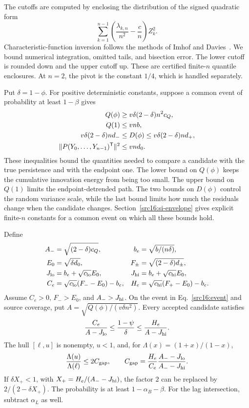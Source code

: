 The cutoffs are computed by enclosing the distribution of the signed quadratic form
\[
 \sum_{k=1}^{n-1}\left(\frac{\lambda_{k,n}}{n^2}
              -\frac{c}{n}\right)Z_k^2.
\]
Characteristic-function inversion follows the methods of Imhof and Davies~\cite{imhof1961,davies1980}. We bound numerical integration, omitted tails, and bisection error. The lower cutoff is rounded down and the upper cutoff up. These are certified finite-$n$ quantile enclosures. At $n=2$, the pivot is the constant $1/4$, which is handled separately.


Put $\delta=1-\phi$. For positive deterministic constants, suppose a common event of probability at least $1-\beta$ gives
\begin{align}\label{src16:event}
 Q(\phi)&\ge v\delta(2-\delta)n^2c_Q,\notag\\
 Q(1)&\le vnb,\notag\\
 v\delta(2-\delta)nd_-&\le D(\phi)\le v\delta(2-\delta)nd_+,\notag\\
 \|P(Y_0,\ldots,Y_{n-1})^{\mathsf T}\|^2&\le vnd_0.
\end{align}
These inequalities bound the quantities needed to compare a candidate with the true persistence and with the endpoint one. The lower bound on $Q(\phi)$ keeps the cumulative innovation energy from being too small. The upper bound on $Q(1)$ limits the endpoint-detrended path. The two bounds on $D(\phi)$ control the random variance scale, while the last bound limits how much the residuals change when the candidate changes. Section~\ref{src16:si-envelope} gives explicit finite-$n$ constants for a common event on which all these bounds hold.

\begin{theorem*}\label{src16:envelope-thm}
Define
\begin{align*}
 A_-&=\sqrt{(2-\delta)c_Q},& b_e&=\sqrt{b/(n\delta)},\\
 E_0&=\sqrt{\delta d_0},& F_\pm&=\sqrt{(2-\delta)d_\pm},\\
 J_{\rm lo}&=b_e+\sqrt{c_{\rm lo}}E_0,&
 J_{\rm hi}&=b_e+\sqrt{c_{\rm hi}}E_0,\\
 C_e&=\sqrt{c_{\rm lo}}(F_--E_0)-b_e,&
 H_e&=\sqrt{c_{\rm hi}}(F_+-E_0)-b_e.
\end{align*}
Assume $C_e>0$, $F_->E_0$, and $A_->J_{\rm hi}$. On the event in Eq.~\eqref{src16:event} and source coverage, put $A=\sqrt{Q(\phi)/(v\delta n^2)}$. Every accepted candidate satisfies
\begin{equation}\label{src16:gap}
 \frac{C_e}{A-J_{\rm lo}}
 \le \frac{1-\psi}{\delta}
 \le \frac{H_e}{A-J_{\rm hi}}.
\end{equation}
The hull $[\ell,u]$ is nonempty, $u<1$, and, for $\Lambda(x)=(1+x)/(1-x)$,
\begin{equation}\label{src16:span}
 \frac{\Lambda(u)}{\Lambda(\ell)}\le 2C_{\rm gap},\qquad
 C_{\rm gap}=\frac{H_e}{C_e}
             \frac{A_--J_{\rm lo}}{A_--J_{\rm hi}}.
\end{equation}
If $\delta X_+<1$, with $X_+=H_e/(A_--J_{\rm hi})$, the factor $2$ can be replaced by $2/(2-\delta X_+)$. The probability is at least $1-\alpha_B-\beta$. For the lag intersection, subtract $\alpha_L$ as well.
\end{theorem*}


